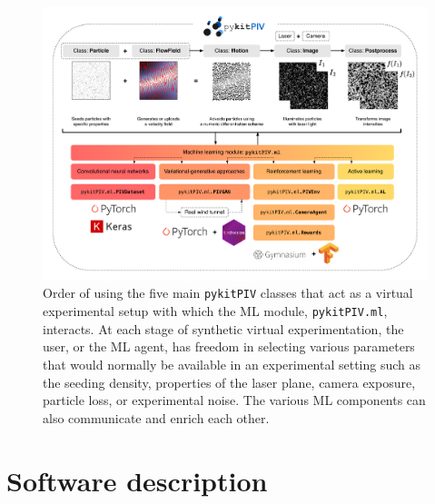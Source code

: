 \documentclass[a4paper,fleqn]{cas-dc}
\begin{document}
\begin{figure}[t]
\centering
\vspace{-0.4 in}
\includegraphics[width=\textwidth]{pykitPIV-modules.pdf}
\vspace{10 pt}
\caption{\footnotesize Order of using the five main \texttt{pykitPIV} classes that act as a virtual experimental setup with which the ML module, \texttt{pykitPIV.ml}, interacts. At each stage of synthetic virtual experimentation, the user, or the ML agent, has freedom in selecting various parameters that would normally be available in an experimental setting such as the seeding density, properties of the laser plane, camera exposure, particle loss, or experimental noise. The various ML components can also communicate and enrich each other.}
\label{fig:pykitPIV-overview}
\end{figure}

\section{Software description} \label{sec:software}



\end{document}
